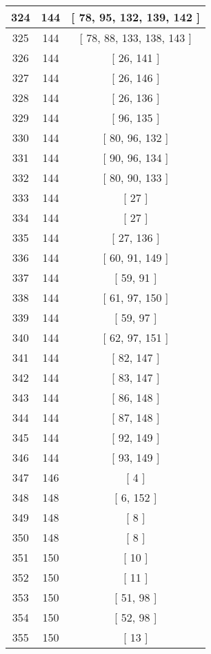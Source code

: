\begin{center}
\begin{longtable}[H]{|| c c c ||}
\hline
324 & 144 & [ 78, 95, 132, 139, 142 ] \\ 
\hline
325 & 144 & [ 78, 88, 133, 138, 143 ] \\ 
\hline
326 & 144 & [ 26, 141 ] \\ 
\hline
327 & 144 & [ 26, 146 ] \\ 
\hline
328 & 144 & [ 26, 136 ] \\ 
\hline
329 & 144 & [ 96, 135 ] \\ 
\hline
330 & 144 & [ 80, 96, 132 ] \\ 
\hline
331 & 144 & [ 90, 96, 134 ] \\ 
\hline
332 & 144 & [ 80, 90, 133 ] \\ 
\hline
333 & 144 & [ 27 ] \\ 
\hline
334 & 144 & [ 27 ] \\ 
\hline
335 & 144 & [ 27, 136 ] \\ 
\hline
336 & 144 & [ 60, 91, 149 ] \\ 
\hline
337 & 144 & [ 59, 91 ] \\ 
\hline
338 & 144 & [ 61, 97, 150 ] \\ 
\hline
339 & 144 & [ 59, 97 ] \\ 
\hline
340 & 144 & [ 62, 97, 151 ] \\ 
\hline
341 & 144 & [ 82, 147 ] \\ 
\hline
342 & 144 & [ 83, 147 ] \\ 
\hline
343 & 144 & [ 86, 148 ] \\ 
\hline
344 & 144 & [ 87, 148 ] \\ 
\hline
345 & 144 & [ 92, 149 ] \\ 
\hline
346 & 144 & [ 93, 149 ] \\ 
\hline
347 & 146 & [ 4 ] \\ 
\hline
348 & 148 & [ 6, 152 ] \\ 
\hline
349 & 148 & [ 8 ] \\ 
\hline
350 & 148 & [ 8 ] \\ 
\hline
351 & 150 & [ 10 ] \\ 
\hline
352 & 150 & [ 11 ] \\ 
\hline
353 & 150 & [ 51, 98 ] \\ 
\hline
354 & 150 & [ 52, 98 ] \\ 
\hline
355 & 150 & [ 13 ] \\ 
\hline
\end{longtable}
\end{center}
